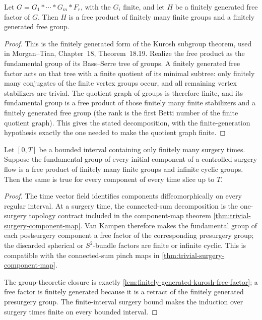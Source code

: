 \begin{lemma}
\label{lem:finitely-generated-kurosh-free-factor}
\notready
Let
$G=G_1*\cdots*G_m*F_r$, with the $G_i$ finite, and let $H$ be a finitely
generated free factor of $G$.  Then $H$ is a free product of finitely many
finite groups and a finitely generated free group.
\end{lemma}

\begin{proof}
This is the finitely generated form of the Kurosh subgroup theorem, used in
Morgan--Tian, Chapter~18, Theorem~18.19.  Realize the free product as the
fundamental group of its Bass--Serre tree of groups.  A finitely generated
free factor acts on that tree with a finite quotient of its minimal subtree:
only finitely many conjugates of the finite vertex groups occur, and all
remaining vertex stabilizers are trivial.  The quotient graph of groups is
therefore finite, and its fundamental group is a free product of those
finitely many finite stabilizers and a finitely generated free group (the
rank is the first Betti number of the finite quotient graph).  This gives the
stated decomposition, with the finite-generation hypothesis exactly the one
needed to make the quotient graph finite.
\end{proof}

\begin{theorem}
\label{thm:component-fundamental-group-persistence}
\notready
Let $[0,T]$ be a bounded interval containing only finitely many surgery times.
Suppose the fundamental group of every initial component of a controlled
surgery flow is a free product of finitely many finite groups and infinite
cyclic groups.  Then the same is true for every component of every time slice
up to $T$.
\end{theorem}

\begin{proof}
The time vector field identifies components diffeomorphically on every
regular interval.  At a surgery time, the connected-sum decomposition is the
one-surgery topology contract included in the component-map theorem
\ref{thm:trivial-surgery-component-map}.  Van Kampen therefore
makes the fundamental group of each postsurgery component a free factor of the
corresponding presurgery group; the discarded spherical or $S^2$-bundle
factors are finite or infinite cyclic.  This is compatible with the
connected-sum pinch maps in \ref{thm:trivial-surgery-component-map}.

The group-theoretic closure is exactly
\ref{lem:finitely-generated-kurosh-free-factor}; a free factor is finitely
generated because it is a retract of the finitely generated presurgery group.
The finite-interval surgery bound makes the induction over surgery times
finite on every bounded interval.
\end{proof}


